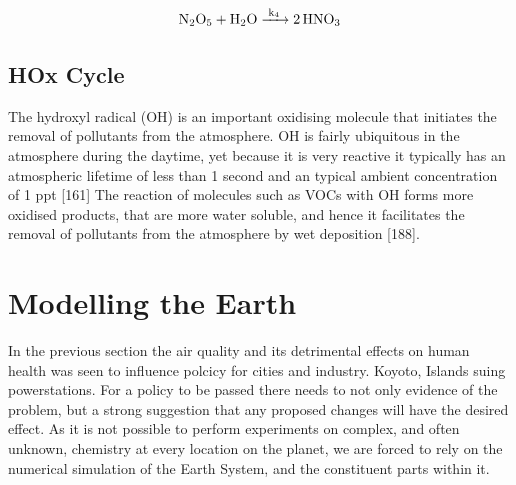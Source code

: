 \begin{equation}
  \ce{N2O5 + H2O ->[k4] 2HNO3}
  \label{eqn:hno3}
\end{equation}



\subsection{HOx Cycle}

The hydroxyl radical (OH) is an important oxidising molecule that initiates the removal of pollutants from the atmosphere. OH is fairly ubiquitous in the atmosphere during the daytime, yet because it is very reactive it typically has an atmospheric lifetime of less than 1 second and an typical ambient concentration of 1 ppt [161]
The reaction of molecules such as VOCs with OH forms more oxidised products, that are more water soluble, and hence it facilitates the removal of pollutants from the atmosphere by wet deposition [188].



\section{Modelling the Earth}
In the previous section the air quality and its detrimental effects on human health was seen to influence polcicy for cities and industry. Koyoto, Islands suing powerstations.
For a policy to be passed there needs to not only evidence of the problem, but a strong suggestion that any proposed changes will have the desired effect. As it is not possible to perform experiments on complex, and often unknown, chemistry at every location on the planet, we are forced to rely on the numerical simulation of the Earth System, and the constituent parts within it.
